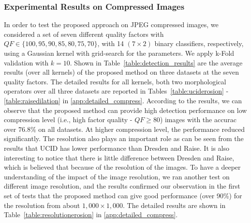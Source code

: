\documentclass[review]{elsarticle}
\begin{document}
\subsubsection{Experimental Results on Compressed Images}
%
In order to test the proposed approach on JPEG compressed images, we considered a set of seven different quality factors with $QF \in \{100,95,90,85,80,75,70\}$, with 14 $(7\times 2)$ binary classifiers, respectively,
using a Gaussian kernel with grid-search for the parameters. We apply k-Fold validation with $k = 10$. Shown in Table~\ref{table:detection_results} are the average results (over all kernels) of the proposed method on three datasets at the seven quality factors. The detailed results for all kernels, both two morphological operators over all three datasets are reported in Tables~\ref{table:uciderosion} - \ref{table:raisedilation} in \ref{app:detailed_compress}. According to the results, we can observe that the proposed method can provide high detection performance on low compression level (i.e., high factor quality - $QF \ge 80$) images with the accurac over $76.8\%$ on all datasets. At higher compression level, the performance reduced significantly. The resolution also plays an important role as can be seen from the results that UCID has lower performance than Dresden and Raise. It is also interesting to notice that there is little difference between Dresden and Raise, which is believed that because of the resolution of the images. To have a deeper understanding of the impact of the image resolution, we ran another test on different image resolution, and the results confirmed our observation in the first set of tests that the proposed method can give good performance (over 90\%) for the resolution from about $1,000 \times 1,000$. The detailed results are shown in Table~\ref{table:resolutionerosion} in \ref{app:detailed_compress}.
\end{document}
